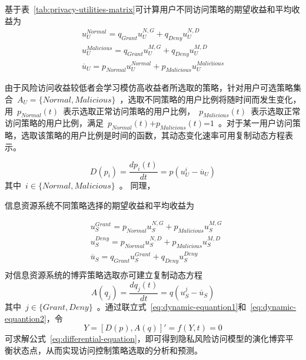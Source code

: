 基于表~\ref{tab:privacy-utilities-matrix}可计算用户不同访问策略的期望收益和平均收益为
\begin{eqnarray}\label{eq:utilities-users}
u_{U}^{Normal}={{q}_{Grant}}u_{U}^{N,G}+{{q}_{Deny}}u_{U}^{N,D} \\ 
 u_{U}^{Malicious}={{q}_{Grant}}u_{U}^{M,G}+{{q}_{Deny}}u_{U}^{M,D} \\ 
{{\overline{u}}_{U}}={{p}_{Normal}}u_{U}^{Normal}+{{p}_{Malicious}}u_{U}^{Malic\text{i}ious}
\end{eqnarray}


由于风险访问收益较低者会学习模仿高收益者所选取的策略，针对用户可选策略集合~${{A}_{U}}=\{Normal,Malicious\}$~，选取不同策略的用户比例将随时间而发生变化，用~${{p}_{Normal}}(t)$~表示选取正常访问策略的用户比例，~${{p}_{Malicious}}(t)$~表示选取正常访问策略的用户比例，满足~${{p}_{Normal}}(t)\text{+}{{p}_{Malicious}}(t)\text{=}1$~。对于某一用户访问策略，选取该策略的用户比例是时间的函数，其动态变化速率可用复制动态方程表示。

\begin{equation}\label{eq:dynamic-equantion1}
D({{p}_{i}})=\frac{d{{p}_{i}}(t)}{dt}=p(u_{U}^{i}-{{\overline{u}}_{U}})
\end{equation}
其中~$i\in \{Normal,Malicious\}$~。
同理，

信息资源系统不同策略选择的期望收益和平均收益为

\begin{align}
& u_{S}^{Grant}={{p}_{Normal}}u_{S}^{N,G}+{{p}_{Malicious}}u_{S}^{M,G} \\ 
& u_{S}^{Deny}={{p}_{Normal}}u_{S}^{N,D}+{{p}_{Malicious}}u_{S}^{M,D} \\ 
& {{\overline{u}}_{S}}={{q}_{Grant}}u_{S}^{Grant}+{{q}_{Deny}}u_{S}^{Deny} \\ 
\end{align}
对信息资源系统的博弈策略选取亦可建立复制动态方程
\begin{equation}\label{eq:dynamic-equantion2}
A({{q}_{j}})=\frac{d{{q}_{j}}(t)}{dt}=q(u_{S}^{j}-{{\overline{u}}_{S}})
\end{equation}
其中~$j\in \{Grant,Deny\}$~。通过联立式~\ref{eq:dynamic-equantion1}和~\ref{eq:dynamic-equantion2}，令
\begin{equation}\label{eq:differential-equation}
Y=[ D(p), A(q)]'=f(Y,t)=0
\end{equation}
可求解公式~\ref{eq:differential-equation}，即可得到隐私风险访问模型的演化博弈平衡状态点，从而实现访问控制策略选取的分析和预测。



